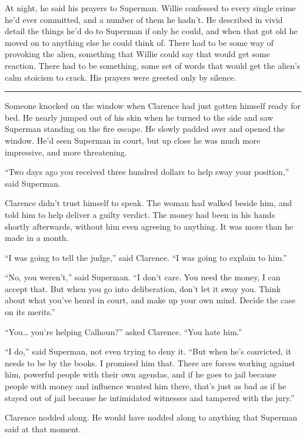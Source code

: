 \documentclass[ebook,12pt]{memoir}
\begin{document}
At night, he said his prayers to Superman. Willie confessed to every
single crime he'd ever committed, and a number of them he hadn't. He
described in vivid detail the things he'd do to Superman if only he
could, and when that got old he moved on to anything else he could think
of. There had to be some way of provoking the alien, something that
Willie could say that would get some reaction. There had to be
something, some set of words that would get the alien's calm stoicism to
crack. His prayers were greeted only by silence.

\begin{center}\rule{0.5\linewidth}{\linethickness}\end{center}

Someone knocked on the window when Clarence had just gotten himself
ready for bed. He nearly jumped out of his skin when he turned to the
side and saw Superman standing on the fire escape. He slowly padded over
and opened the window. He'd seen Superman in court, but up close he was
much more impressive, and more threatening.

``Two days ago you received three hundred dollars to help sway your
position,'' said Superman.

Clarence didn't trust himself to speak. The woman had walked beside him,
and told him to help deliver a guilty verdict. The money had been in his
hands shortly afterwards, without him even agreeing to anything. It was
more than he made in a month.

``I was going to tell the judge,'' said Clarence. ``I was going to
explain to him.''

``No, you weren't,'' said Superman. ``I don't care. You need the money,
I can accept that. But when you go into deliberation, don't let it sway
you. Think about what you've heard in court, and make up your own mind.
Decide the case on its merits.''

``You\ldots{} you're helping Calhoun?'' asked Clarence. ``You hate
him.''

``I do,'' said Superman, not even trying to deny it. ``But when he's
convicted, it needs to be by the books. I promised him that. There are
forces working against him, powerful people with their own agendas, and
if he goes to jail because people with money and influence wanted him
there, that's just as bad as if he stayed out of jail because he
intimidated witnesses and tampered with the jury.''

Clarence nodded along. He would have nodded along to anything that
Superman said at that moment.
\end{document}
